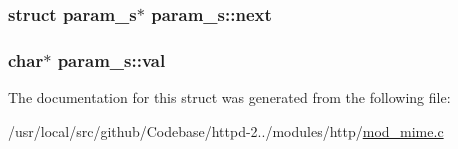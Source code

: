 \subsubsection[{\texorpdfstring{next}{next}}]{\setlength{\rightskip}{0pt plus 5cm}struct {\bf param\+\_\+s}$\ast$ param\+\_\+s\+::next}\hypertarget{structparam__s_ae832fea9caff93e412f1bbdabf60e857}{}\label{structparam__s_ae832fea9caff93e412f1bbdabf60e857}
\subsubsection[{\texorpdfstring{val}{val}}]{\setlength{\rightskip}{0pt plus 5cm}char$\ast$ param\+\_\+s\+::val}\hypertarget{structparam__s_a0a6dc944de0408390eeb1587625a0766}{}\label{structparam__s_a0a6dc944de0408390eeb1587625a0766}


The documentation for this struct was generated from the following file\+:\begin{DoxyCompactItemize}
\item 
/usr/local/src/github/\+Codebase/httpd-\/2../modules/http/\hyperlink{mod__mime_8c}{mod\+\_\+mime.\+c}\end{DoxyCompactItemize}
